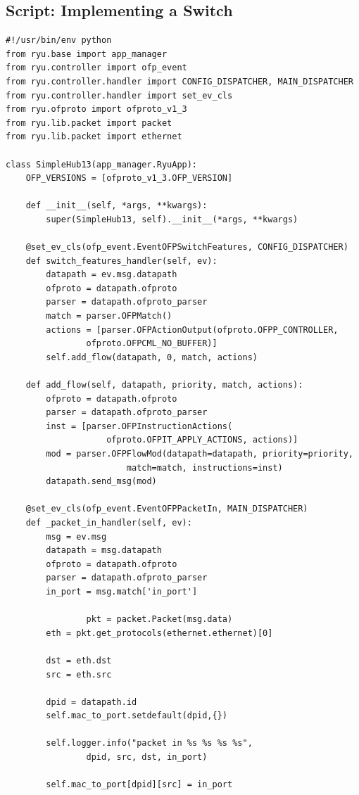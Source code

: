 \documentclass[a4,12pt]{scrartcl}
\begin{document}
\subsection{Script: Implementing a Switch}
\begin{lstlisting}
#!/usr/bin/env python
from ryu.base import app_manager
from ryu.controller import ofp_event
from ryu.controller.handler import CONFIG_DISPATCHER, MAIN_DISPATCHER
from ryu.controller.handler import set_ev_cls
from ryu.ofproto import ofproto_v1_3
from ryu.lib.packet import packet
from ryu.lib.packet import ethernet

class SimpleHub13(app_manager.RyuApp):
    OFP_VERSIONS = [ofproto_v1_3.OFP_VERSION]

    def __init__(self, *args, **kwargs):
        super(SimpleHub13, self).__init__(*args, **kwargs)

    @set_ev_cls(ofp_event.EventOFPSwitchFeatures, CONFIG_DISPATCHER)
    def switch_features_handler(self, ev):
        datapath = ev.msg.datapath
        ofproto = datapath.ofproto
        parser = datapath.ofproto_parser
        match = parser.OFPMatch()
        actions = [parser.OFPActionOutput(ofproto.OFPP_CONTROLLER, 
        		ofproto.OFPCML_NO_BUFFER)]
        self.add_flow(datapath, 0, match, actions)

    def add_flow(self, datapath, priority, match, actions):
        ofproto = datapath.ofproto
        parser = datapath.ofproto_parser
        inst = [parser.OFPInstructionActions(
        			ofproto.OFPIT_APPLY_ACTIONS, actions)]
        mod = parser.OFPFlowMod(datapath=datapath, priority=priority, 
        				match=match, instructions=inst)
        datapath.send_msg(mod)

    @set_ev_cls(ofp_event.EventOFPPacketIn, MAIN_DISPATCHER)
    def _packet_in_handler(self, ev):
        msg = ev.msg
        datapath = msg.datapath
        ofproto = datapath.ofproto
        parser = datapath.ofproto_parser
        in_port = msg.match['in_port']
        
                pkt = packet.Packet(msg.data)
        eth = pkt.get_protocols(ethernet.ethernet)[0]

        dst = eth.dst
        src = eth.src

        dpid = datapath.id
        self.mac_to_port.setdefault(dpid,{})

        self.logger.info("packet in %s %s %s %s", 
        		dpid, src, dst, in_port)

        self.mac_to_port[dpid][src] = in_port


\end{lstlisting}
\end{document}
